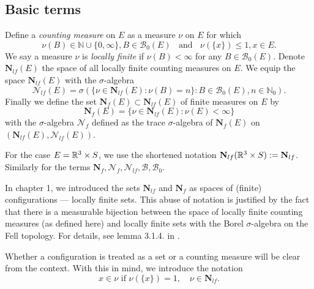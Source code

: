 \subsection{Basic terms}
\begin{definition}\label{def:measures}
Define a \textit{counting measure} on $E$ as a measure $\nu$ on $E$ for which
$$\nu(B)\in\mathbb N \cup \{0,\infty\}, B\in\mathcal B_0(E)\;\;\text{ and } \; \; \nu(\{x\})\leq 1, x\in E.$$
We say a measure $\nu$ is \textit{locally finite} if $\nu(B)<\infty$ for any $B\in \mathcal  B_0(E)$. Denote $\mathbf N_{lf}(E)$ the space of all locally finite counting measures on $E$.
We equip the space $\mathbf N_{lf}(E)$ with the $\sigma$-algebra
$$\mathcal N_{lf}(E)=\sigma(\{\nu \in \mathbf N_{lf}(E): \nu(B)=n\}: B \in \mathcal B_0(E), n\in \mathbb N_0).$$
Finally we define the set $\mathbf N_f(E) \subset \mathbf N_{lf}(E)$ of finite measures on $E$ by
$$\mathbf N_f(E) = \{\nu \in \mathbf N_{lf}(E): \nu(E)<\infty\}$$
with the $\sigma$-algebra $\mathcal N_{f}$ defined as the trace $\sigma$-algebra of $\mathbf N_{f}(E)$ on $(\mathbf N_{lf}(E),\mathcal N_{lf}(E))$.
\end{definition}

For the case $E={\mathbb R^3}\times S$, we use the shortened notation $\mathbf N_{lf}({\mathbb R^3}\times S) := \mathbf N_{lf}$. Similarly for the terms $\mathbf N_{f}, \mathcal N_{f}, \mathcal N_{lf}, \mathcal B, \mathcal B_0$.

\begin{remark}
	In chapter 1, we introduced the sets $\mathbf N_{lf}$ and $\mathbf N_f$ as spaces of (finite) configurations --- locally finite sets. This abuse of notation is justified by the fact that there is a measurable bijection between the space of locally finite counting measures (as defined here) and locally finite sets with the Borel $\sigma$-algebra on the Fell topology. For details, see lemma 3.1.4. in \cite{SchneiderWeil2008}.   

	Whether a configuration is treated as a set or a counting measure will be clear from the context. With this in mind, we introduce the notation 
	$$x\in \nu \text{ if } \nu(\{x\})=1, \quad \nu \in \mathbf N_{lf}.$$
\end{remark}

